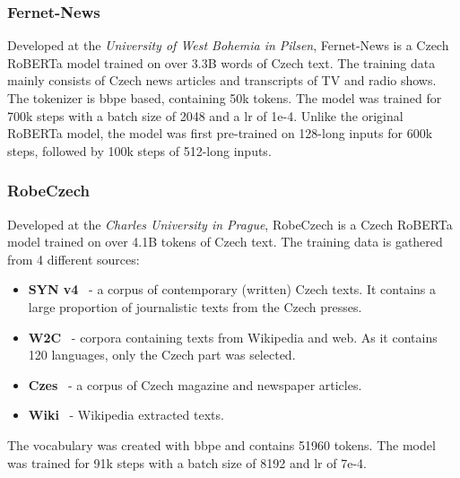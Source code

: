 \subsubsection{Fernet-News}
\label{sec:fernet}
Developed at the \textit{University of West Bohemia in Pilsen}, Fernet-News is a Czech RoBERTa model trained on
over 3.3B words of Czech text. The training data mainly consists of Czech news articles and transcripts of TV and radio shows.
The tokenizer is \ac{bbpe} based, containing 50k tokens.
The model was trained for 700k steps with a batch size of 2048 and a \acf{lr} of 1e-4.
Unlike the original RoBERTa model, the model was first pre-trained on 128-long inputs for 600k steps, followed by 100k steps
of 512-long inputs.

\subsubsection{RobeCzech}
\label{sec:robe-czech}
Developed at the \textit{Charles University in Prague}, RobeCzech is a Czech RoBERTa model trained on over
4.1B tokens of Czech text. The training data is gathered from 4 different sources:
\begin{itemize}
    \item \textbf{SYN v4}~\parencite*{11234/1-1846} - a corpus of contemporary (written) Czech texts. It contains a large proportion
          of journalistic texts from the Czech presses.
    \item \textbf{W2C}~\parencite*{11858/00-097C-0000-0022-6133-9} - corpora containing texts from Wikipedia and web. As it contains 120 languages, only the Czech part was selected.
    \item \textbf{Czes}~\parencite*{11858/00-097C-0000-0001-CCCF-C} - a corpus of Czech magazine and newspaper articles.
    \item \textbf{Wiki}~\parencite*{strakaRobeCzechCzechRoBERTa2021} - Wikipedia extracted texts.
\end{itemize}
The vocabulary was created with \ac{bbpe} and contains 51960 tokens.
The model was trained for 91k steps with a batch size of 8192 and \ac{lr} of 7e-4.


